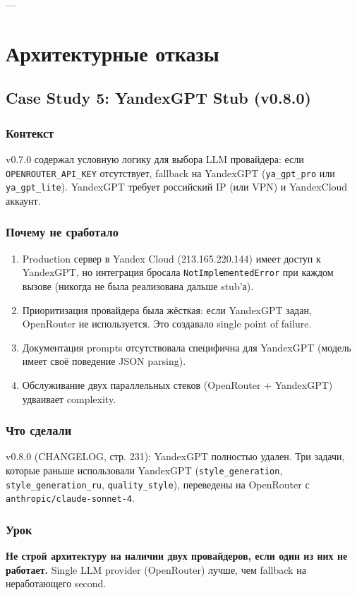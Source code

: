 ---

\section{Архитектурные отказы}

\subsection{Case Study 5: YandexGPT Stub (v0.8.0)}

\subsubsection*{Контекст}
v0.7.0 содержал условную логику для выбора LLM провайдера: если \texttt{OPENROUTER\_API\_KEY} отсутствует, fallback на YandexGPT (\texttt{ya\_gpt\_pro} или \texttt{ya\_gpt\_lite}). YandexGPT требует российский IP (или VPN) и YandexCloud аккаунт.

\subsubsection*{Почему не сработало}
\begin{enumerate}
\item Production сервер в Yandex Cloud (213.165.220.144) имеет доступ к YandexGPT, но интеграция бросала \texttt{NotImplementedError} при каждом вызове (никогда не была реализована дальше stub'а).
\item Приоритизация провайдера была жёсткая: если YandexGPT задан, OpenRouter не используется. Это создавало single point of failure.
\item Документация prompts отсутствовала специфична для YandexGPT (модель имеет своё поведение JSON parsing).
\item Обслуживание двух параллельных стеков (OpenRouter + YandexGPT) удваивает complexity.
\end{enumerate}

\subsubsection*{Что сделали}
v0.8.0 (CHANGELOG, стр. 231): YandexGPT полностью удален. Три задачи, которые раньше использовали YandexGPT (\texttt{style\_generation}, \texttt{style\_generation\_ru}, \texttt{quality\_style}), переведены на OpenRouter с \texttt{anthropic/claude-sonnet-4}.

\subsubsection*{Урок}
\textbf{Не строй архитектуру на наличии двух провайдеров, если один из них не работает.} Single LLM provider (OpenRouter) лучше, чем fallback на неработающего second.

